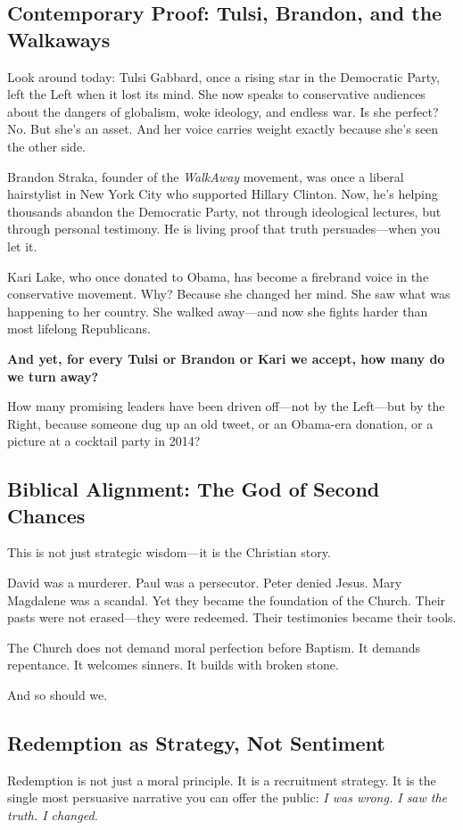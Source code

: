 \subsection*{Contemporary Proof: Tulsi, Brandon, and the Walkaways}
Look around today: Tulsi Gabbard, once a rising star in the Democratic Party, left the Left when it lost its mind. She now speaks to conservative audiences about the dangers of globalism, woke ideology, and endless war. Is she perfect? No. But she’s an asset. And her voice carries weight exactly because she’s seen the other side.

Brandon Straka, founder of the \textit{WalkAway} movement, was once a liberal hairstylist in New York City who supported Hillary Clinton. Now, he's helping thousands abandon the Democratic Party, not through ideological lectures, but through personal testimony. He is living proof that truth persuades—when you let it.

Kari Lake, who once donated to Obama, has become a firebrand voice in the conservative movement. Why? Because she changed her mind. She saw what was happening to her country. She walked away—and now she fights harder than most lifelong Republicans.

\textbf{And yet, for every Tulsi or Brandon or Kari we accept, how many do we turn away?}

How many promising leaders have been driven off—not by the Left—but by the Right, because someone dug up an old tweet, or an Obama-era donation, or a picture at a cocktail party in 2014?

\subsection*{Biblical Alignment: The God of Second Chances}
This is not just strategic wisdom—it is the Christian story.

David was a murderer. Paul was a persecutor. Peter denied Jesus. Mary Magdalene was a scandal. Yet they became the foundation of the Church. Their pasts were not erased—they were redeemed. Their testimonies became their tools.

The Church does not demand moral perfection before Baptism. It demands repentance. It welcomes sinners. It builds with broken stone.

And so should we.

\subsection*{Redemption as Strategy, Not Sentiment}
Redemption is not just a moral principle. It is a recruitment strategy. It is the single most persuasive narrative you can offer the public: \textit{I was wrong. I saw the truth. I changed.}

